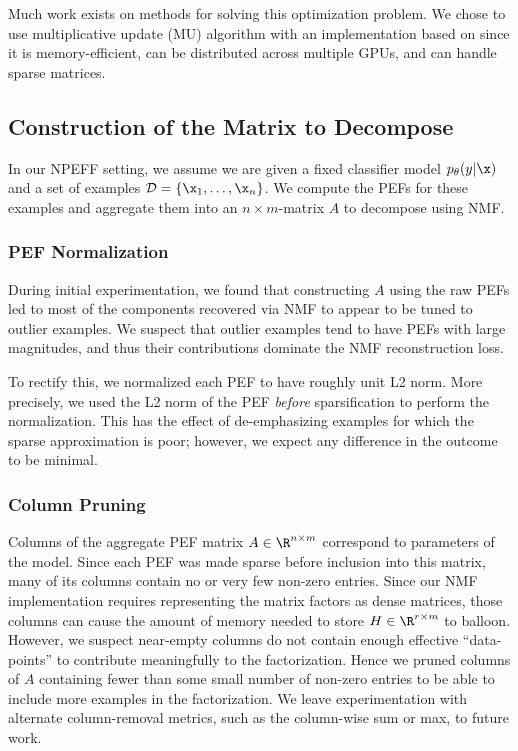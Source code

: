 \documentclass[dvipsnames]{article}
\begin{document}
Much work exists on methods for solving this optimization problem.
We chose to use multiplicative update (MU) algorithm with an implementation based on \citet{boureima2022distributed} since it is memory-efficient, can be distributed across multiple GPUs, and can handle sparse matrices.
% 


\subsection{Construction of the Matrix to Decompose}
In our NPEFF setting, we assume we are given a fixed classifier model $p_\theta(y|\x)$ and a set of examples $\mathcal D = \{\x_1,\dotsc,\x_n\}$.
We compute the PEFs for these examples and aggregate them into an $n \times m$-matrix $A$ to decompose using NMF.

\subsubsection{PEF Normalization}
During initial experimentation, we found that constructing $A$ using the raw PEFs led to most of the components recovered via NMF to appear to be tuned to outlier examples.
We suspect that outlier examples tend to have PEFs with large magnitudes, and thus their contributions dominate the NMF reconstruction loss.

To rectify this, we normalized each PEF to have roughly unit L2 norm.
More precisely, we used the L2 norm of the PEF \textit{before} sparsification to perform the normalization.
This has the effect of de-emphasizing examples for which the sparse approximation is poor; however, we expect any difference in the outcome to be minimal.

\subsubsection{Column Pruning}
Columns of the aggregate PEF matrix $A \in \R^{n\times m}$ correspond to parameters of the model.
Since each PEF was made sparse before inclusion into this matrix, many of its columns contain no or very few non-zero entries.
Since our NMF implementation requires representing the matrix factors as dense matrices, those columns can cause the amount of memory needed to store $H \in \R^{r\times m}$ to balloon.
However, we suspect near-empty columns do not contain enough effective ``data-points'' to contribute meaningfully to the factorization.
Hence we pruned columns of $A$ containing fewer than some small number of non-zero entries to be able to include more examples in the factorization.
We leave experimentation with alternate column-removal metrics, such as the column-wise sum or max, to future work.
\end{document}
